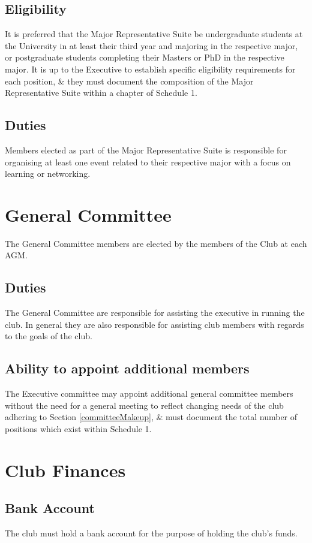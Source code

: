 \documentclass[11pt]{article}
\begin{document}
\subsection{Eligibility}
It is preferred that the Major Representative Suite be undergraduate students at the University in at least their third year and majoring in the respective major, or postgraduate students completing their Masters or PhD in the respective major. It is up to the Executive to establish specific eligibility requirements for each position, \& they must document the composition of the Major Representative Suite within a chapter of Schedule 1.
\subsection{Duties}
Members elected as part of the Major Representative Suite is responsible for organising at least one event related to their respective major with a focus on learning or networking.

\section{General Committee}
The General Committee members are elected by the members of the Club at each AGM.
\subsection{Duties}
The General Committee are responsible for assisting the executive in running the club. In general they are also responsible for assisting club members with regards to the goals of the club.
\subsection{Ability to appoint additional members}
The Executive committee may appoint additional general committee members without the need for a general meeting to reflect changing needs of the club adhering to Section \ref{committeeMakeup}, \& must document the total number of positions which exist within Schedule 1.

\section{Club Finances}
\subsection{Bank Account}
The club must hold a bank account for the purpose of holding the club’s funds.
\end{document}
